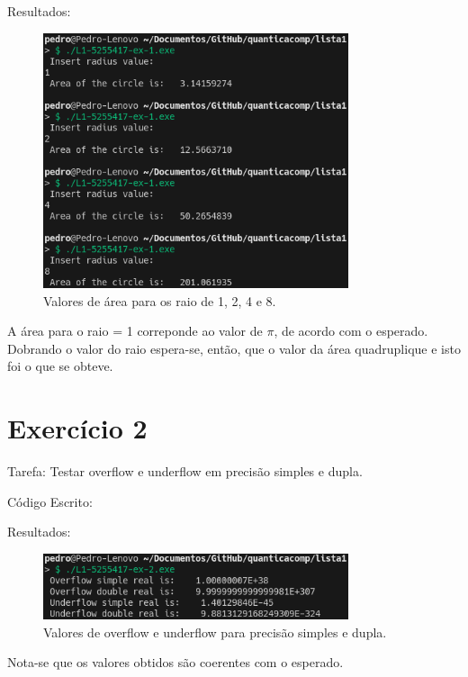 \documentclass[12pt, a4paper]{article} %
\begin{document}
    Resultados:
    \begin{figure}[H]
        \centering
        \includegraphics[width=0.8\textwidth]{../images/results-ex1.png}
        \caption{Valores de \'area para os raio de 1, 2, 4 e 8.}
    \end{figure}

    A \'area para o raio = 1 correponde ao valor de $\pi$, de acordo com o esperado. Dobrando o valor do raio espera-se, então, que o valor da \'area quadruplique e isto foi o que se obteve.

\section{Exerc\'icio 2}

    Tarefa: Testar overflow e underflow em precis\~ao simples e dupla.

    C\'odigo Escrito:
    

    Resultados:
    \begin{figure}[H]
        \centering
        \includegraphics[width=0.8\textwidth]{../images/results-ex2.png}
        \caption{Valores de overflow e underflow para precis\~ao simples e dupla.}
    \end{figure}

    Nota-se que os valores obtidos s\~ao coerentes com o esperado.
\end{document}
